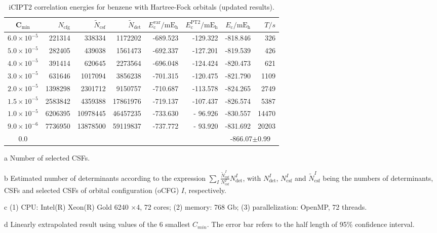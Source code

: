 \documentclass[journal=jcp,manuscript=suppinfo]{achemso}
\begin{document}
\begin{table}[!htp]
	\small
	\caption{iCIPT2 correlation energies for benzene with Hartree-Fock orbitals (updated results).}
\begin{threeparttable}
	\begin{tabular}{c|rrrrrrr}\toprule
		C$_{\text{min}}$&$N_{\mathrm{cfg}}$&$\tilde{N}_{\mathrm{csf}}$\tnote{a}&$\tilde{N}_{\mathrm{det}}$\tnote{b}
		&$E_{\mathrm{c}}^{\mathrm{var}}/\mathrm{mE_h}$&$E_{\mathrm{c}}^{\mathrm{PT2}}/\mathrm{mE_h}$&$E_{\mathrm{c}}/\mathrm{mE_h}$&$T/s$\tnote{c}\\\toprule
	$6.0\times10^{-5}$ &  221314 &   338334 & 1172202
	& -689.523 &    -129.322 &  -818.846 &326\\
	$5.0\times10^{-5}$ &  282405 &   439038 & 1561473
	& -692.337 &    -127.201 &  -819.539 &426\\
	$4.0\times10^{-5}$ &  391414 &   620645 & 2273564
	& -696.048 &    -124.424 &  -820.473 &621\\
	$3.0\times10^{-5}$ &  631646 &  1017094 & 3856238
	& -701.315 &    -120.475 &  -821.790 &1109\\
	$2.0\times10^{-5}$ & 1398298 &  2301712 & 9150757
	& -710.687 &    -113.578 &  -824.265 &2749\\
	$1.5\times10^{-5}$ & 2583842 &  4359388 &17861976
	& -719.137 &    -107.437 &  -826.574 &5387\\
	$1.0\times10^{-5}$ & 6206395 & 10978445 &46457235
	& -733.630 &    - 96.926 &  -830.557 &14470\\
	$9.0\times10^{-6}$ & 7736950 & 13878500 &59119837
	& -737.772 &    - 93.920 &  -831.692 &20203\\\midrule
	0.0\tnote{b}&&&&&&\multicolumn{2}{c}{-866.07$\pm$0.99}\\\bottomrule
	\end{tabular}
\begin{tablenotes}
	\item[a]Number of selected CSFs.
	\item[b]Estimated number of determinants according to the expression $\sum_I\frac{\tilde{N}_{\mathrm{csf}}^I}{N_{\mathrm{csf}}^I}N_{\mathrm{det}}^I$, with $N_{\mathrm{det}}^I$, $N_{\mathrm{csf}}^I$ and $\tilde{N}_{\mathrm{csf}}^I$ being the numbers of determinants, CSFs and selected CSFs of orbital configuration (oCFG) $I$, respectively.
	\item[c](1) CPU: Intel(R) Xeon(R) Gold 6240 $\times$4, 72 cores; (2) memory: 768 Gb; (3) parallelization: OpenMP, 72 threads.
	\item[d]Linearly extrapolated result using values of the 6 smallest $C_{min}$. The error bar refers to the half length of 95\% confidence interval.
\end{tablenotes}
\end{threeparttable}
\label{NewHF}
\end{table}
\end{document}
